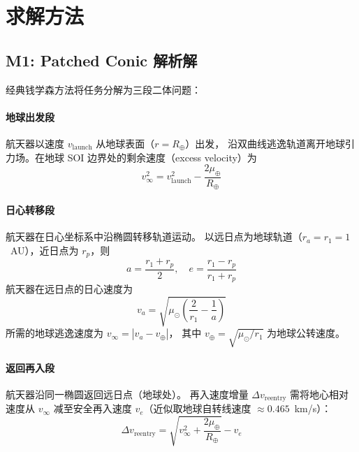 \documentclass[a4paper,12pt]{article}
\begin{document}
\section{求解方法}\label{sec:method}

\subsection{M1: Patched Conic 解析解}\label{sec:m1}

经典钱学森方法将任务分解为三段二体问题：

\paragraph{地球出发段}
航天器以速度 $v_{\mathrm{launch}}$ 从地球表面（$r = R_\oplus$）出发，
沿双曲线逃逸轨道离开地球引力场。在地球 SOI 边界处的剩余速度（excess velocity）为
\begin{equation}
  v_\infty^2 = v_{\mathrm{launch}}^2 - \frac{2\mu_\oplus}{R_\oplus}
\end{equation}

\paragraph{日心转移段}
航天器在日心坐标系中沿椭圆转移轨道运动。
以远日点为地球轨道（$r_a = r_1 = 1$~AU），近日点为 $r_p$，则
\begin{equation}
  a = \frac{r_1 + r_p}{2}, \quad
  e = \frac{r_1 - r_p}{r_1 + r_p}
\end{equation}
航天器在远日点的日心速度为
\begin{equation}
  v_a = \sqrt{\mu_\odot \left(\frac{2}{r_1} - \frac{1}{a}\right)}
\end{equation}
所需的地球逃逸速度为 $v_\infty = |v_a - v_\oplus|$，
其中 $v_\oplus = \sqrt{\mu_\odot / r_1}$ 为地球公转速度。

\paragraph{返回再入段}
航天器沿同一椭圆返回远日点（地球处）。
再入速度增量 $\Delta v_{\mathrm{reentry}}$ 需将地心相对速度从 $v_\infty$
减至安全再入速度 $v_e$（近似取地球自转线速度 $\approx 0.465$~km/s）：
\begin{equation}
  \Delta v_{\mathrm{reentry}} = \sqrt{v_\infty^2 + \frac{2\mu_\oplus}{R_\oplus}} - v_e
\end{equation}
\end{document}
